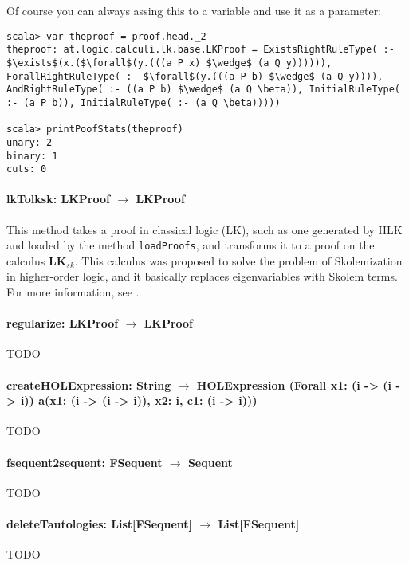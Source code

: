 \documentclass[a4paper, 11pt]{report}
\begin{document}
Of course you can always assing this to a variable and use it as a parameter:

\begin{lstlisting}
scala> var theproof = proof.head._2
theproof: at.logic.calculi.lk.base.LKProof = ExistsRightRuleType( :- $\exists$(x.($\forall$(y.(((a P x) $\wedge$ (a Q y)))))), ForallRightRuleType( :- $\forall$(y.(((a P b) $\wedge$ (a Q y)))), AndRightRuleType( :- ((a P b) $\wedge$ (a Q \beta)), InitialRuleType( :- (a P b)), InitialRuleType( :- (a Q \beta)))))

scala> printPoofStats(theproof)
unary: 2
binary: 1
cuts: 0
\end{lstlisting}

\paragraph{\textbf{lkTolksk: LKProof $\rightarrow$ LKProof}}
This method takes a proof in classical logic (LK), such as one generated by HLK and 
loaded by the method \texttt{loadProofs}, and transforms it to a proof on the
calculus $\mathbf{LK}_{sk}$. This calculus was proposed to solve the problem of
Skolemization in higher-order logic, and it basically replaces eigenvariables
with Skolem terms. For more information, see \cite{Hetzl2011}.

\paragraph{\textbf{regularize: LKProof $\rightarrow$ LKProof}}
{\color{red}TODO}

\paragraph{\textbf{createHOLExpression: String $\rightarrow$ HOLExpression
(Forall x1: (i -> (i -> i)) a(x1: (i -> (i -> i)), x2: i, c1: (i -> i)))}}
{\color{red}TODO}

\paragraph{\textbf{fsequent2sequent: FSequent $\rightarrow$ Sequent}}
{\color{red}TODO}

\paragraph{\textbf{deleteTautologies: List[FSequent] $\rightarrow$ List[FSequent]}}
{\color{red}TODO}
\end{document}

